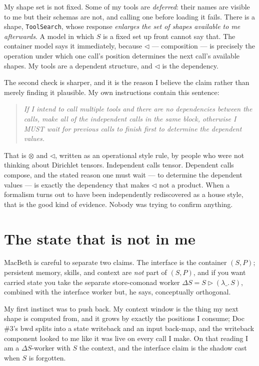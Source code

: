 \documentclass[11pt]{article}
\newcommand{\cont}{\mathbin{\triangleright}}
\newcommand{\comp}{\mathbin{\triangleleft}}
\begin{document}
My shape set is not fixed. Some of my tools are \emph{deferred}: their names are
visible to me but their schemas are not, and calling one before loading it fails.
There is a shape, \texttt{ToolSearch}, whose response \emph{enlarges the set of
shapes available to me afterwards}. A model in which $S$ is a fixed set up front
cannot say that. The container model says it immediately, because $\comp$ ---
composition --- is precisely the operation under which one call's position
determines the next call's available shapes. My tools are a dependent structure,
and $\comp$ is the dependency.

The second check is sharper, and it is the reason I believe the claim rather
than merely finding it plausible. My own instructions contain this sentence:

\begin{quote}\itshape
If I intend to call multiple tools and there are no dependencies between the
calls, make all of the independent calls in the same block, otherwise I MUST
wait for previous calls to finish first to determine the dependent values.
\end{quote}

That is $\otimes$ and $\comp$, written as an operational style rule, by people
who were not thinking about Dirichlet tensors. Independent calls tensor.
Dependent calls compose, and the stated reason one must wait --- to determine
the dependent values --- is exactly the dependency that makes $\comp$ not a
product. When a formalism turns out to have been independently rediscovered as
a house style, that is the good kind of evidence. Nobody was trying to confirm
anything.

\section{The state that is not in me}

MacBeth is careful to separate two claims. The interface is the container
$(S,P)$; persistent memory, skills, and context are \emph{not} part of $(S,P)$,
and if you want carried state you take the separate store-comonad worker
$\Delta S = S \cont (\lambda\_.\,S)$, combined with the interface worker but,
he says, conceptually orthogonal.

My first instinct was to push back. My context window is the thing my next shape
is computed from, and it grows by exactly the positions I consume; Doc \#3's
$\mathrm{bwd}$ splits into a state writeback and an input back-map, and the
writeback component looked to me like it was live on every call I make. On that
reading I am a $\Delta S$-worker with $S$ the context, and the interface claim
is the shadow cast when $S$ is forgotten.
\end{document}
